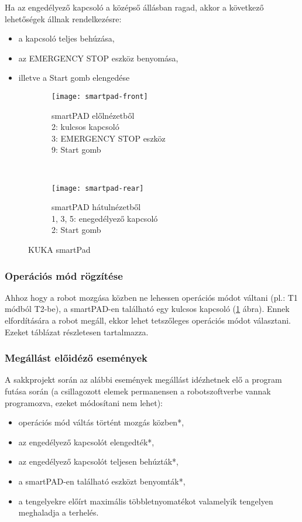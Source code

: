 \documentclass[../documentation.tex]{subfiles}
\begin{document}
Ha az engedélyező kapcsoló a középső állásban ragad, akkor a következő lehetőségek állnak rendelkezésre:
\begin{itemize}
	\item a kapcsoló teljes behúzása,
	\item az EMERGENCY STOP eszköz benyomása,
	\item illetve a Start gomb elengedése
\end{itemize}

\begin{figure}[h]
    \centering
    \begin{subfigure}[t]{0.5\textwidth}
        \centering
        \texttt{[image: smartpad-front]}
        \caption{smartPAD előlnézetből\\ 2: kulcsos kapcsoló\\ 3: EMERGENCY STOP eszköz \\ 9: Start gomb}
    \end{subfigure}%
    ~ 
    \begin{subfigure}[t]{0.5\textwidth}
        \centering
        \texttt{[image: smartpad-rear]}
        \caption{smartPAD hátulnézetből\\ 1, 3, 5: enegedélyező kapcsoló\\ 2: Start gomb}
    \end{subfigure}
    \caption{KUKA smartPad\cite{sunrisemanual}}
    \label{fig:smartpad}
\end{figure}

\subsubsection{Operációs mód rögzítése}
Ahhoz hogy a robot mozgása közben ne lehessen operációs módot váltani (pl.: T1 módból T2-be), a smartPAD-en található egy kulcsos kapcsoló (\ref{fig:smartpad} ábra). Ennek elfordítására a robot megáll, ekkor lehet tetszőleges operációs módot választani. Ezeket  táblázat részletesen tartalmazza.

\subsubsection{Megállást előidéző események}
A sakkprojekt során az alábbi események megállást idézhetnek elő a program futása során (a csillagozott elemek permanensen a robotszoftverbe vannak programozva, ezeket módosítani nem lehet):
\begin{itemize}
	\item operációs mód váltás történt mozgás közben*,
	\item az engedélyező kapcsolót elengedték*,
	\item az engedélyező kapcsolót teljesen behúzták*,
	\item a smartPAD-en található  eszközt benyomták*,
	\item a tengelyekre előírt maximális többletnyomatékot valamelyik tengelyen meghaladja a terhelés.
\end{itemize}
\end{document}
